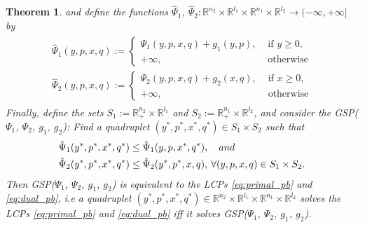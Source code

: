 \documentclass[a4paper,9pt]{extarticle}
\newtheorem{theorem}{Theorem}
\begin{document}
\begin{theorem}
and define the functions $\hat{\Psi}_1$, $\hat{\Psi}_2:
\mathbb{R}^{n_2} \times \mathbb{R}^{l_1} \times \mathbb{R}^{n_1}
\times \mathbb{R}^{l_2} \rightarrow (-\infty, +\infty]$ by
\begin{eqnarray}
  \begin{aligned}
    \hat{\Psi}_1(y, p, x, q) :=\begin{cases}
    \Psi_1(y, p, x, q)+ g_1(y, p), &\mbox{ if }y \ge 0,\\
    +\infty, &\mbox{ otherwise}\end{cases}\\
    \hat{\Psi}_2(y, p, x, q) :=\begin{cases}
    \Psi_2(y, p, x, q)+ g_2(x, q), &\mbox{ if }x \ge 0,\\
    +\infty, &\mbox{ otherwise}\end{cases}
  \end{aligned}
\end{eqnarray}
Finally, define the sets $S_1 := \mathbb{R}^{n_2}_+ \times
\mathbb{R}^{l_1}$ and $S_2 := \mathbb{R}^{n_1}_+ \times
\mathbb{R}^{l_2}$, and consider the GSP($\Psi_1$, $\Psi_2$, $g_1$,
$g_2$): Find a quadruplet $(y^*,p^*, x^*, q^*) \in S_1 \times S_2$
such that
\begin{eqnarray}
  \begin{split}
    &\hat{\Psi}_1(y^*, p^*, x^*, q^*) \le \hat{\Psi}_1(y, p, x^*,
    q^*),\hspace{1em}and\\
    &\hat{\Psi}_2(y^*, p^*, x^*, q^*)
    \le \hat{\Psi}_2(y^*, p^*, x, q),\hspace{.21em} \forall (y,p, x, q)
    \in S_1 \times S_2.
  \label{eq:unconstrained_pb}
\end{split}
\end{eqnarray}
\label{thm:pd}
Then GSP($\Psi_1$,
  $\Psi_2$, $g_1$, $g_2$) is equivalent to the LCPs
  \eqref{eq:primal_pb} and \eqref{eq:dual_pb}, i.e
a quadruplet $(y^*,p^*, x^*, q^*) \in \mathbb{R}^{n_2}
  \times \mathbb{R}^{l_1} \times \mathbb{R}^{n_1} \times
  \mathbb{R}^{l_2}$ solves the LCPs
  \eqref{eq:primal_pb} and \eqref{eq:dual_pb} iff it solves
  GSP($\Psi_1$, $\Psi_2$, $g_1$, $g_2$). 
  \label{thm:pd}
\end{theorem}
\end{document}
